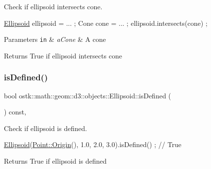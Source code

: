 Check if ellipsoid intersects cone. 


\begin{DoxyCode}
\hyperlink{classostk_1_1math_1_1geom_1_1d3_1_1objects_1_1_ellipsoid_a106c71abf9503f3d06b2613c1c7e9d65}{Ellipsoid} ellipsoid = ... ;
Cone cone = ... ;
ellipsoid.intersects(cone) ;
\end{DoxyCode}



\begin{DoxyParams}[1]{Parameters}
\mbox{\tt in}  & {\em a\+Cone} & A cone \\
\hline
\end{DoxyParams}
\begin{DoxyReturn}{Returns}
True if ellipsoid intersects cone 
\end{DoxyReturn}
\mbox{\label{classostk_1_1math_1_1geom_1_1d3_1_1objects_1_1_ellipsoid_a21c465d185052a1631fe3ddcc131512d}} 
\subsubsection{\texorpdfstring{is\+Defined()}{isDefined()}}
{\footnotesize\ttfamily bool ostk\+::math\+::geom\+::d3\+::objects\+::\+Ellipsoid\+::is\+Defined (\begin{DoxyParamCaption}{ }\end{DoxyParamCaption}) const\hspace{0.3cm}{\ttfamily [override]}, {\ttfamily [virtual]}}



Check if ellipsoid is defined. 


\begin{DoxyCode}
\hyperlink{classostk_1_1math_1_1geom_1_1d3_1_1objects_1_1_ellipsoid_a106c71abf9503f3d06b2613c1c7e9d65}{Ellipsoid}(\hyperlink{classostk_1_1math_1_1geom_1_1d3_1_1objects_1_1_point_a079c199f08b015d456d02728a71b534c}{Point::Origin}(), 1.0, 2.0, 3.0).isDefined() ; \textcolor{comment}{// True}
\end{DoxyCode}


\begin{DoxyReturn}{Returns}
True if ellipsoid is defined 
\end{DoxyReturn}


